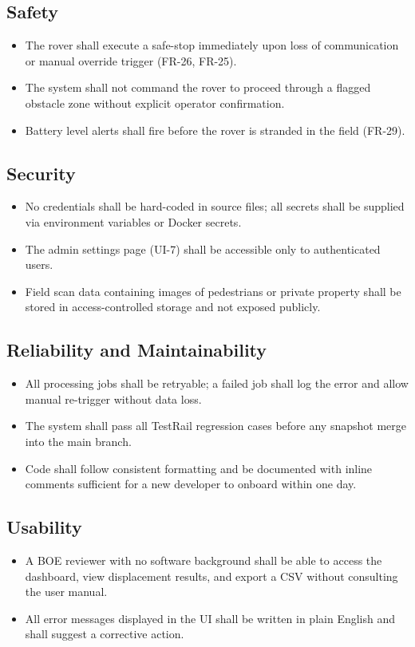 \documentclass{article}
\begin{document}
\subsection{Safety}
\begin{itemize}
  \item The rover shall execute a safe-stop immediately upon loss of communication or
    manual override trigger (FR-26, FR-25).
  \item The system shall not command the rover to proceed through a flagged obstacle
    zone without explicit operator confirmation.
  \item Battery level alerts shall fire before the rover is stranded in the field
    (FR-29).
\end{itemize}

\subsection{Security}
\begin{itemize}
  \item No credentials shall be hard-coded in source files; all secrets shall be
    supplied via environment variables or Docker secrets.
  \item The admin settings page (UI-7) shall be accessible only to authenticated users.
  \item Field scan data containing images of pedestrians or private property shall be
    stored in access-controlled storage and not exposed publicly.
\end{itemize}

\subsection{Reliability and Maintainability}
\begin{itemize}
  \item All processing jobs shall be retryable; a failed job shall log the error and
    allow manual re-trigger without data loss.
  \item The system shall pass all TestRail regression cases before any snapshot merge
    into the main branch.
  \item Code shall follow consistent formatting and be documented with inline comments
    sufficient for a new developer to onboard within one day.
\end{itemize}

\subsection{Usability}
\begin{itemize}
  \item A BOE reviewer with no software background shall be able to access the
    dashboard, view displacement results, and export a CSV without consulting the user
    manual.
  \item All error messages displayed in the UI shall be written in plain English and
    shall suggest a corrective action.
\end{itemize}
\end{document}
